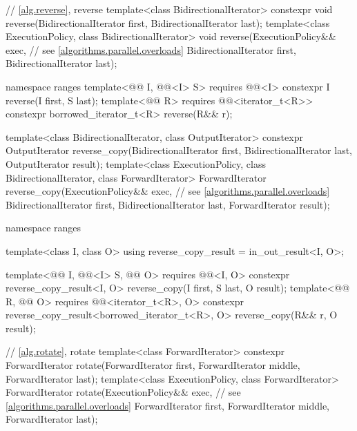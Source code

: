 \begin{codeblock}
{  // \ref{alg.reverse}, reverse
  template<class BidirectionalIterator>
    constexpr void reverse(BidirectionalIterator first, BidirectionalIterator last);
  template<class ExecutionPolicy, class BidirectionalIterator>
    void reverse(ExecutionPolicy&& exec,                        // see \ref{algorithms.parallel.overloads}
                 BidirectionalIterator first, BidirectionalIterator last);

  namespace ranges {
    template<@@ I, @@<I> S>
      requires @@<I>
      constexpr I reverse(I first, S last);
    template<@@ R>
      requires @@<iterator_t<R>>
      constexpr borrowed_iterator_t<R> reverse(R&& r);
  }

  template<class BidirectionalIterator, class OutputIterator>
    constexpr OutputIterator
      reverse_copy(BidirectionalIterator first, BidirectionalIterator last,
                   OutputIterator result);
  template<class ExecutionPolicy, class BidirectionalIterator, class ForwardIterator>
    ForwardIterator
      reverse_copy(ExecutionPolicy&& exec,                      // see \ref{algorithms.parallel.overloads}
                   BidirectionalIterator first, BidirectionalIterator last,
                   ForwardIterator result);

  namespace ranges {
    template<class I, class O>
      using reverse_copy_result = in_out_result<I, O>;

    template<@@ I, @@<I> S, @@ O>
      requires @@<I, O>
      constexpr reverse_copy_result<I, O>
        reverse_copy(I first, S last, O result);
    template<@@ R, @@ O>
      requires @@<iterator_t<R>, O>
      constexpr reverse_copy_result<borrowed_iterator_t<R>, O>
        reverse_copy(R&& r, O result);
  }

  // \ref{alg.rotate}, rotate
  template<class ForwardIterator>
    constexpr ForwardIterator rotate(ForwardIterator first,
                                     ForwardIterator middle,
                                     ForwardIterator last);
  template<class ExecutionPolicy, class ForwardIterator>
    ForwardIterator rotate(ExecutionPolicy&& exec,              // see \ref{algorithms.parallel.overloads}
                           ForwardIterator first,
                           ForwardIterator middle,
                           ForwardIterator last);

}
\end{codeblock}
